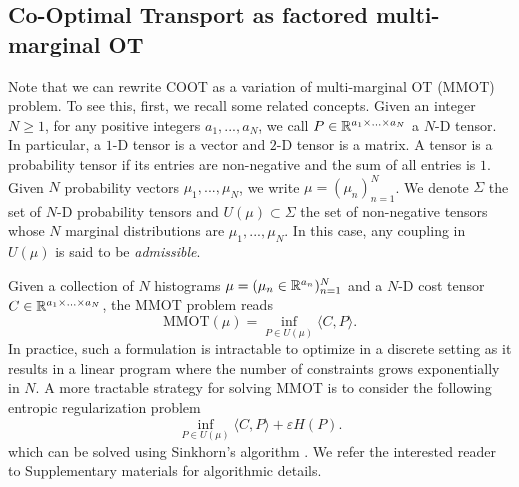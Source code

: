 \subsection{Co-Optimal Transport as factored multi-marginal OT} \label{subsec:MMOT_DC}

Note that we can rewrite COOT as a variation of multi-marginal OT (MMOT) problem.
To see this, first, we recall some related concepts.
Given an integer $N \geq 1$, for any positive integers $a_1,..., a_N$, we call
$P \in \mathbb R^{a_1 \times ... \times a_N}$ a $N$-D tensor. In particular,
a $1$-D tensor is a vector and $2$-D tensor is a matrix.
A tensor is a probability tensor if its entries are non-negative and the sum of all entries is $1$.
Given $N$ probability vectors $\mu_1, ..., \mu_N$, we write $\mu = (\mu_n)_{n=1}^N$.
We denote $\Sigma$ the set of $N$-D probability tensors and $U(\mu) \subset \Sigma$ the set of non-negative tensors whose $N$
marginal distributions are $\mu_1, ..., \mu_N$. In this case, any coupling in $U(\mu)$ is said to be \textit{admissible}.

Given a collection of $N$ histograms $\mu = (\mu_n \in \mathbb R^{a_n})_{n=1}^N$
and a $N$-D cost tensor $C \in \mathbb R^{a_1 \times ... \times a_N}$, the MMOT problem reads
\begin{equation*}
  \text{MMOT}(\mu) = \inf_{P \in U(\mu)} \langle C, P \rangle.
\end{equation*}
In practice, such a formulation is intractable to optimize in a discrete setting as it results in a linear program where the number
of constraints grows exponentially in $N$. A more tractable strategy for solving MMOT is to consider the following entropic
regularization problem
\begin{equation} \label{MMOT_primal}
  \inf_{P \in U(\mu)} \langle C, P \rangle + \varepsilon H(P).
\end{equation}
which can be solved using Sinkhorn's algorithm \citep{Benamou14}. We refer the interested reader to Supplementary materials for algorithmic details.

